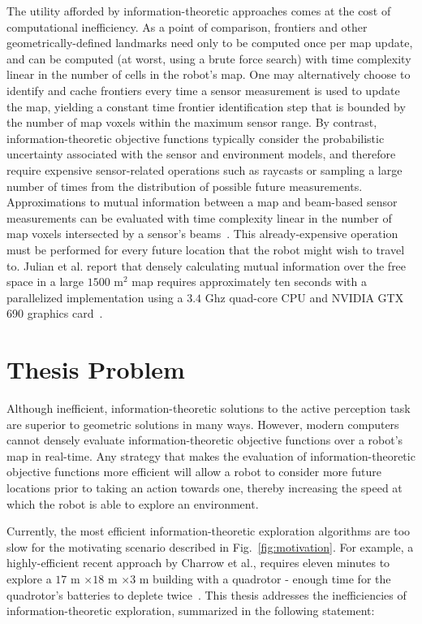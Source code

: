 The utility afforded by information-theoretic approaches comes at the cost of
computational inefficiency.
As a point of comparison, frontiers and other geometrically-defined landmarks
need only to be computed once per map update, and can be computed (at worst, using a brute force search)
with time complexity linear in the number of cells in the robot's map.
One may alternatively choose to identify and cache frontiers every time a sensor
measurement is used to update the map, yielding a constant time frontier
identification step that is bounded by the number of map voxels within the maximum sensor range.
By contrast, information-theoretic objective functions typically consider the probabilistic
uncertainty associated with the sensor and environment models, and therefore
require expensive sensor-related operations such as raycasts or sampling a large
number of times from the distribution of possible future measurements.
Approximations to mutual information between a map and beam-based sensor
measurements can be evaluated with time complexity linear in the number of map
voxels intersected by a sensor's
beams~\cite{julian2013mutualthesis,charrow2015icra,nelson2015iros}. This
already-expensive operation must be performed for every future location that the
robot might wish to travel to. Julian et al. report that densely calculating
mutual information over the free space in a large $1500$ m$^{2}$ map requires
approximately ten seconds with a parallelized implementation using a $3.4$ Ghz
quad-core CPU and NVIDIA GTX 690 graphics card~\cite{julian2013mutual}.

\section{Thesis Problem}

Although inefficient, information-theoretic solutions to the active perception task
are superior to geometric solutions in many ways. However, modern computers cannot densely
evaluate information-theoretic objective functions over a robot's map in real-time.
Any strategy that makes the evaluation of information-theoretic objective functions more
efficient will allow a robot to consider more future locations prior to taking
an action towards one, thereby increasing the speed at which the robot is able
to explore an environment.

Currently, the most efficient information-theoretic exploration algorithms are
too slow for the motivating scenario described in
Fig.~\ref{fig:motivation}. For example, a highly-efficient recent approach
by Charrow et al., requires eleven minutes to explore a $17$ m $\times 18$ m $
\times 3$ m building with a quadrotor - enough time for the quadrotor's batteries to
deplete twice~\cite{charrow2015icra}. This thesis addresses the inefficiencies of information-theoretic exploration,
summarized in the following statement:

